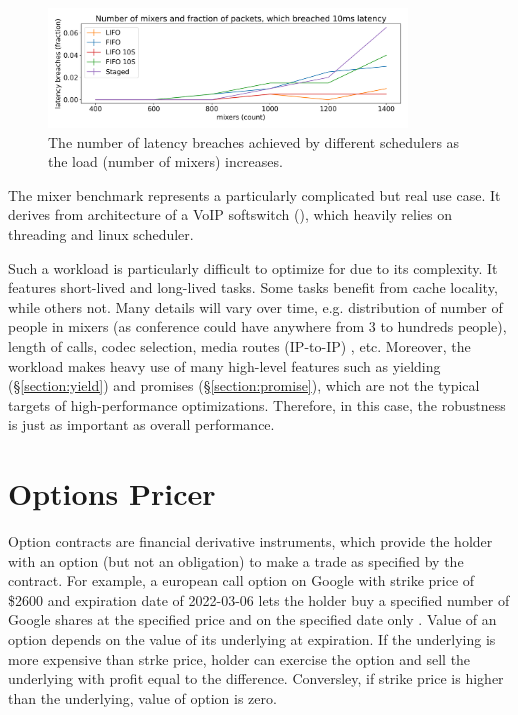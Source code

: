 \documentclass[12pt,a4paper,twoside]{report}
\begin{document}
\begin{figure} 
    \centering 
    \includegraphics[width=0.85\textwidth]{eval/mixer-base8.png}
    \caption{The number of latency breaches achieved by different schedulers as the load (number of mixers) increases.}
   \label{fig:mixer-bench}
\end{figure}

The mixer benchmark represents a particularly complicated but real use case. It derives from architecture of a VoIP softswitch (\cite{Maruzzelli2017-ou}), which heavily relies on threading and linux scheduler. 

Such a workload is particularly difficult to optimize for due to its complexity. It features short-lived and long-lived tasks. Some tasks benefit from cache locality, while others not. Many details will vary over time, e.g. distribution of number of people in mixers (as conference could have anywhere from 3 to hundreds people), length of calls, codec selection, media routes (IP-to-IP) \cite{Frequent1:online}, etc. Moreover, the workload makes heavy use of many high-level features such as yielding (\S\ref{section:yield}) and promises (\S\ref{section:promise}), which are not the typical targets of high-performance optimizations. Therefore, in this case, the robustness is just as important as overall performance. 


\section{Options Pricer}
Option contracts are financial derivative instruments, which provide the holder with an option (but not an obligation) to make a trade as specified by the contract. For example, a european call option on Google with strike price of \$2600 and expiration date of 2022-03-06 lets the holder buy a specified number of Google shares at the specified price and on the specified date only \cite{Hull_John}. Value of an option depends on the value of its underlying at expiration. If the underlying is more expensive than strke price, holder can exercise the option and sell the underlying with profit equal to the difference. Conversley, if strike price is higher than the underlying, value of option is zero.  
\end{document}
